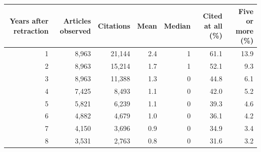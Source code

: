 
\begin{tabular}[t]{rrrrrrr}
\toprule
Years after retraction & Articles observed & Citations & Mean & Median & Cited at all (\%) & Five or more (\%)\\
\midrule
1 & 8,963 & 21,144 & 2.4 & 1 & 61.1 & 13.9\\
2 & 8,963 & 15,214 & 1.7 & 1 & 52.1 & 9.3\\
3 & 8,963 & 11,388 & 1.3 & 0 & 44.8 & 6.1\\
4 & 7,425 & 8,493 & 1.1 & 0 & 42.0 & 5.2\\
5 & 5,821 & 6,239 & 1.1 & 0 & 39.3 & 4.6\\
6 & 4,882 & 4,679 & 1.0 & 0 & 36.1 & 4.2\\
7 & 4,150 & 3,696 & 0.9 & 0 & 34.9 & 3.4\\
8 & 3,531 & 2,763 & 0.8 & 0 & 31.6 & 3.2\\
\bottomrule
\end{tabular}
